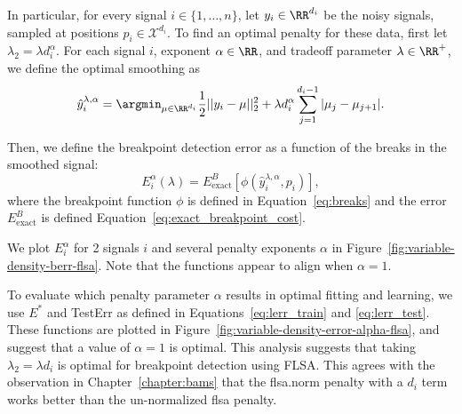\documentclass{article}
\begin{document}
\newpage

In particular, for every signal $i\in\{1,\dots,n\}$, let
$y_i\in\RR^{d_i}$ be the noisy signals, sampled at positions
$p_i\in\mathcal X^{d_i}$. To find an optimal penalty for these data,
first let $\lambda_2 = \lambda d_i^\alpha$. For each signal $i$,
exponent $\alpha\in\RR$, and tradeoff parameter $\lambda\in\RR^+$, we
define the optimal smoothing as
\begin{equation}
  \label{eq:flsa_lambda}
  \hat y^{\lambda,\alpha}_i = 
\argmin_{\mu\in\RR^{d_i}} 
\frac 1 2 ||y_i-\mu||_2^2
+\lambda d_i^\alpha \sum_{j=1}^{d_i-1} |\mu_j - \mu_{j+1}|.
\end{equation}

Then, we define the breakpoint detection error as a function of the
breaks in the smoothed signal:
\begin{equation}
  \label{eq:flsa_e_i_alpha}
  E_i^\alpha(\lambda) = 
E^B_{\text{exact}}
\left[
\phi\left(
\hat y^{\lambda,\alpha}_i,p_i
\right)
\right],
\end{equation}
where the breakpoint function $\phi$ is defined in
Equation~\ref{eq:breaks} and the error $E_{\text{exact}}^B$ is defined
Equation~\ref{eq:exact_breakpoint_cost}.

We plot $E_i^\alpha$ for 2 signals $i$ and several penalty exponents
$\alpha$ in Figure~\ref{fig:variable-density-berr-flsa}. Note that the
functions appear to align when $\alpha=1$.


\newpage

To evaluate which penalty parameter $\alpha$ results in optimal
fitting and learning, we use $E^*$ and TestErr as defined in
Equations~\ref{eq:lerr_train} and \ref{eq:lerr_test}. These functions
are plotted in Figure~\ref{fig:variable-density-error-alpha-flsa}, and
suggest that a value of $\alpha=1$ is optimal.  This analysis suggests
that taking $\lambda_2=\lambda d_i$ is optimal for breakpoint
detection using FLSA. This agrees with the observation in
Chapter~\ref{chapter:bams} that the flsa.norm penalty with a $d_i$
term works better than the un-normalized flsa penalty.
\end{document}
